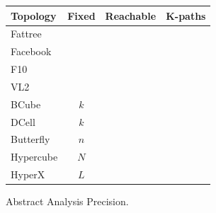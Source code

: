 \documentclass[numbers, 10pt, preprint]{sigplanconf}
\newcommand{\cmark}{\ding{51}}
\newcommand{\xmark}{\ding{55}}
\begin{document}
\begin{figure}[t!]
  \begin{center}
      \begin{tabular}{| l | c | c | c |}
      \hline
      \textbf{Topology} & \textbf{Fixed} & \textbf{Reachable} & \textbf{K-paths} \\ \hline
      Fattree~\cite{fattree} & & \cmark & \cmark  \\ \hline
      Facebook~\cite{facebook-fattree} & & \cmark & \cmark \\ \hline
      F10~\cite{f10-fattree} & & \cmark & \cmark \\ \hline
      VL2~\cite{vl2-fattree} & & & \\ \hline
      BCube~\cite{bcube} & $k$ & \cmark & \xmark \\ \hline
      DCell~\cite{dcell} & $k$ & \cmark & \xmark \\ \hline
      Butterfly~\cite{butterfly} & $n$ & \cmark & \cmark \\ \hline
      Hypercube & $N$ & \cmark & \cmark \\ \hline
      HyperX~\cite{hyperx} & $L$ & \cmark & \cmark \\ \hline
      \end{tabular}
  \end{center}
  \caption{Abstract Analysis Precision.}
  \label{fig:analysis-precision}
\end{figure}

\end{document}
